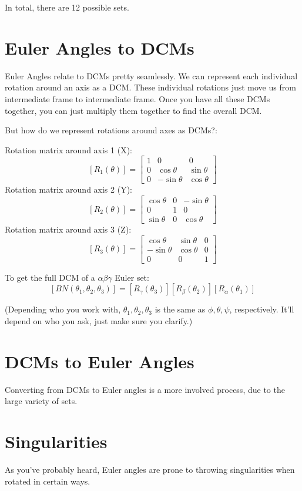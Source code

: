 \documentclass[a4paper,14pt]{extreport}
\begin{document}
In total, there are 12 possible sets.
\section{Euler Angles to DCMs}
Euler Angles relate to DCMs pretty seamlessly. We can represent each individual rotation around an axis as a DCM. These individual rotations just move us from intermediate frame to intermediate frame. Once you have all these DCMs together, you can just multiply them together to find the overall DCM. 

But how do we represent rotations around axes as DCMs?:
\begin{center}
Rotation matrix around axis 1 (X):
\[[R_1(\theta)] = \begin{bmatrix}
			1&0&0\\
			0&\cos{\theta}&\sin{\theta}\\
			0&-\sin{\theta}&\cos{\theta}
	\end{bmatrix}\]	
Rotation matrix around axis 2 (Y):
\[[R_2(\theta)] = \begin{bmatrix}
		\cos{\theta}&0&-\sin{\theta}\\
		0&1&0\\
		\sin{\theta}&0&\cos{\theta}
	\end{bmatrix}\]
Rotation matrix around axis 3 (Z):
\[[R_3(\theta)] = \begin{bmatrix}
		\cos{\theta}&\sin{\theta}&0\\
		-\sin{\theta}&\cos{\theta}&0\\
		0&0&1
	\end{bmatrix}\]

To get the full DCM of a $\alpha\beta\gamma$ Euler set:
\[[BN(\theta_1,\theta_2,\theta_3)] = [R_\gamma(\theta_3)][R_\beta(\theta_2)][R_\alpha(\theta_1)]\]
\end{center}
(Depending who you work with, $\theta_1,\theta_2,\theta_3$ is the same as $\phi,\theta,\psi$, respectively. It'll depend on who you ask, just make sure you clarify.)
\section{DCMs to Euler Angles}
Converting from DCMs to Euler angles is a more involved process, due to the large variety of sets.
\section{Singularities}
As you've probably heard, Euler angles are prone to throwing singularities when rotated in certain ways. 
\end{document}
